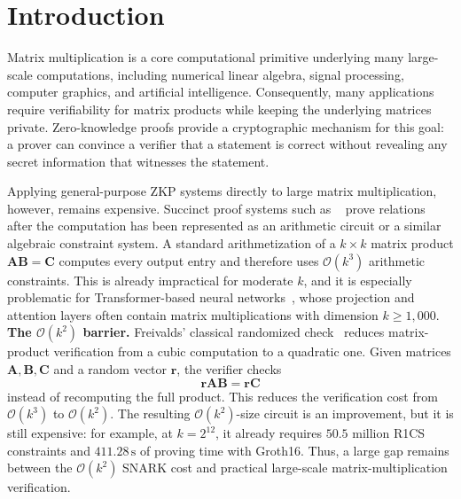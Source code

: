 \documentclass[conference,compsoc]{IEEEtran}
\newcommand{\mat}{\mathbf}          %
\newcommand{\vect}{\mathbf}         %
\theoremstyle{plain}
\theoremstyle{definition}
\theoremstyle{remark}
\begin{document}

\section{Introduction}
\label{sec:intro}

Matrix multiplication is a core computational primitive underlying many large-scale computations, including numerical linear algebra, signal processing, computer graphics, and artificial intelligence.  Consequently, many applications require verifiability for matrix products while keeping the underlying matrices private.  Zero-knowledge proofs provide a cryptographic mechanism for this goal:
a prover can convince a verifier that a statement is correct without revealing any secret information that witnesses the statement.

Applying general-purpose ZKP systems directly to large matrix multiplication, however, remains expensive.  Succinct proof systems such as ~\cite{groth2016size, plonk, maller2019sonic, chiesa2020marlin} prove relations after the computation has been represented as an arithmetic circuit or a similar algebraic constraint system.  
A standard arithmetization of a \(k\times k\) matrix product \(\mat{A}\mat{B}=\mat{C}\) computes every output
entry and therefore uses \(\mathcal{O}(k^3)\) arithmetic constraints.  This is
already impractical for moderate \(k\), and it is especially problematic for
Transformer-based neural networks~\cite{transformer, bert, GPT3}, whose projection and attention layers often
contain matrix multiplications with dimension \(k\ge 1{,}000\). \\

\noindent\textbf{The \(\mathcal{O}(k^2)\) barrier.}
Freivalds' classical randomized check~\cite{freivalds1977probabilistic} reduces
matrix-product verification from a cubic computation to a quadratic one.  Given
matrices \(\mat{A},\mat{B},\mat{C}\) and a random vector \(\vect{r}\), the
verifier checks
\[
  \vect{r}\mat{A}\mat{B}=\vect{r}\mat{C}
\]
instead of recomputing the full product.  This reduces the verification cost
from \(\mathcal{O}(k^3)\) to \(\mathcal{O}(k^2)\).  The resulting
\(\mathcal{O}(k^2)\)-size circuit is an improvement, but it is still expensive:
for example, at \(k=2^{12}\), it already requires \(50.5\) million R1CS
constraints and \ensuremath{411.28\,\text{s}} of proving time with Groth16.  Thus, a large gap remains
between the \(\mathcal{O}(k^2)\) SNARK cost and practical large-scale
matrix-multiplication verification. \\
\end{document}
